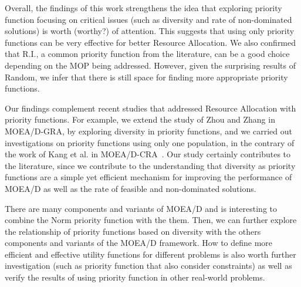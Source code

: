 Overall, the findings of this work strengthens the idea that exploring priority function focusing on critical issues (such as diversity and rate of non-dominated solutions) is worth (worthy?) of attention. This suggests that using only priority functions can be very effective for better Resource Allocation. We also confirmed that R.I., a common priority function from the literature, can be a good choice depending on the MOP being addressed. However, given the surprising results of Random, we infer that there is still space for finding more appropriate priority functions.


Our findings complement recent studies that addressed Resource Allocation with priority functions. For example, we extend the study of Zhou and Zhang in MOEA/D-GRA\cite{zhou2016all}, by exploring diversity in priority functions, and we carried out investigations on priority functions using only one population, in the contrary of the work of Kang et al. in MOEA/D-CRA~\cite{kang2018collaborative}. Our study certainly contributes to the literature, since we contribute to the understanding that diversity as priority functions are a simple yet efficient mechanism for improving the performance of MOEA/D as well as the rate of feasible and non-dominated solutions. 
 
There are many components and variants of MOEA/D and is interesting to combine the Norm priority function with the them. Then, we can further explore the relationship of priority functions based on diversity with the others components and variants of the MOEA/D framework. How to define more efficient and effective utility functions for different problems is also worth further investigation (such as priority function that also consider constraints) as well as verify the results of using priority function in other real-world problems.
%
